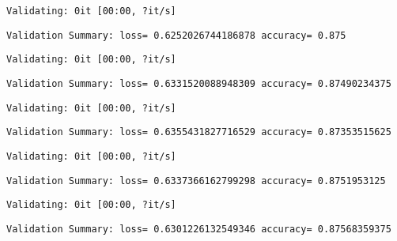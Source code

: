 \documentclass[11pt]{article}
\begin{document}
    
    \begin{Verbatim}[commandchars=\\\{\}]
Validating: 0it [00:00, ?it/s]
    \end{Verbatim}

    
    \begin{Verbatim}[commandchars=\\\{\}]
Validation Summary: loss= 0.6252026744186878 accuracy= 0.875
    \end{Verbatim}

    
    \begin{Verbatim}[commandchars=\\\{\}]
Validating: 0it [00:00, ?it/s]
    \end{Verbatim}

    
    \begin{Verbatim}[commandchars=\\\{\}]
Validation Summary: loss= 0.6331520088948309 accuracy= 0.87490234375
    \end{Verbatim}

    
    \begin{Verbatim}[commandchars=\\\{\}]
Validating: 0it [00:00, ?it/s]
    \end{Verbatim}

    
    \begin{Verbatim}[commandchars=\\\{\}]
Validation Summary: loss= 0.6355431827716529 accuracy= 0.87353515625
    \end{Verbatim}

    
    \begin{Verbatim}[commandchars=\\\{\}]
Validating: 0it [00:00, ?it/s]
    \end{Verbatim}

    
    \begin{Verbatim}[commandchars=\\\{\}]
Validation Summary: loss= 0.6337366162799298 accuracy= 0.8751953125
    \end{Verbatim}

    
    \begin{Verbatim}[commandchars=\\\{\}]
Validating: 0it [00:00, ?it/s]
    \end{Verbatim}

    
    \begin{Verbatim}[commandchars=\\\{\}]
Validation Summary: loss= 0.6301226132549346 accuracy= 0.87568359375
    \end{Verbatim}
\end{document}
